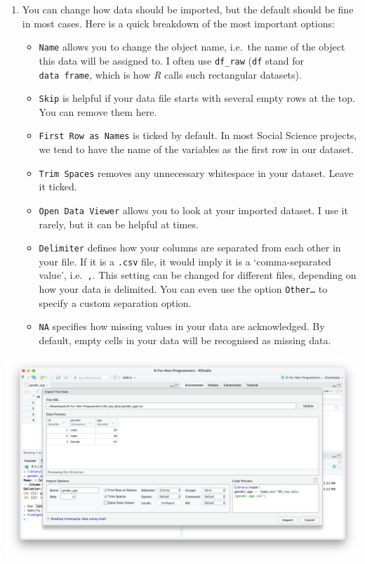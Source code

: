\documentclass[
  letterpaper,
]{krantz}
\begin{document}
\begin{enumerate}
\def\labelenumi{\arabic{enumi}.}
\setcounter{enumi}{3}
\item
  You can change how data should be imported, but the default should be
  fine in most cases. Here is a quick breakdown of the most important
  options:

  \begin{itemize}
  \item
    \texttt{Name} allows you to change the object name, i.e.~the name of
    the object this data will be assigned to. I often use
    \texttt{df\_raw} (\texttt{df} stand for \texttt{data\ frame}, which
    is how \emph{R} calls such rectangular datasets).
  \item
    \texttt{Skip} is helpful if your data file starts with several empty
    rows at the top. You can remove them here.
  \item
    \texttt{First\ Row\ as\ Names} is ticked by default. In most Social
    Science projects, we tend to have the name of the variables as the
    first row in our dataset.
  \item
    \texttt{Trim\ Spaces} removes any unnecessary whitespace in your
    dataset. Leave it ticked.
  \item
    \texttt{Open\ Data\ Viewer} allows you to look at your imported
    dataset. I use it rarely, but it can be helpful at times.
  \item
    \texttt{Delimiter} defines how your columns are separated from each
    other in your file. If it is a \texttt{.csv} file, it would imply it
    is a `comma-separated value', i.e.~\texttt{,}. This setting can be
    changed for different files, depending on how your data is
    delimited. You can even use the option \texttt{Other…} to specify a
    custom separation option.
  \item
    \texttt{NA} specifies how missing values in your data are
    acknowledged. By default, empty cells in your data will be
    recognised as missing data.
  \end{itemize}
\end{enumerate}

\includegraphics{images/chapter_07_img/01_files_pane_import/03_files_pane_import.png}
\end{document}
